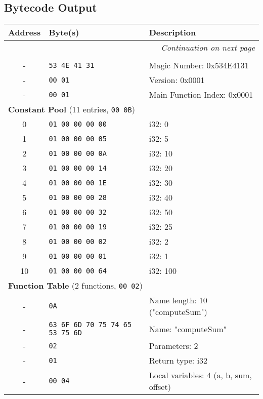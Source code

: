 \documentclass[a4paper,12pt]{article}
\begin{document}
    \subsection{Bytecode Output}
    \begin{longtable}{|c|l|p{6cm}|}
    \hline
    \textbf{Address} & \textbf{Byte(s)} & \textbf{Description} \\ \hline
    \endhead
    \multicolumn{3}{r}{\textit{Continuation on next page}} \\
    \endfoot
    \endlastfoot
    \multicolumn{3}{|l|}{\textbf{Header}} \\ \hline
    - & \texttt{53 4E 41 31} & Magic Number: 0x534E4131 \\ \hline
    - & \texttt{00 01} & Version: 0x0001 \\ \hline
    - & \texttt{00 01} & Main Function Index: 0x0001 \\ \hline
    \multicolumn{3}{|l|}{\textbf{Constant Pool} (11 entries, \texttt{00 0B})} \\ \hline
    0 & \texttt{01 00 00 00 00} & i32: 0 \\ \hline
    1 & \texttt{01 00 00 00 05} & i32: 5 \\ \hline
    2 & \texttt{01 00 00 00 0A} & i32: 10 \\ \hline
    3 & \texttt{01 00 00 00 14} & i32: 20 \\ \hline
    4 & \texttt{01 00 00 00 1E} & i32: 30 \\ \hline
    5 & \texttt{01 00 00 00 28} & i32: 40 \\ \hline
    6 & \texttt{01 00 00 00 32} & i32: 50 \\ \hline
    7 & \texttt{01 00 00 00 19} & i32: 25 \\ \hline
    8 & \texttt{01 00 00 00 02} & i32: 2 \\ \hline
    9 & \texttt{01 00 00 00 01} & i32: 1 \\ \hline
    10 & \texttt{01 00 00 00 64} & i32: 100 \\ \hline
    \multicolumn{3}{|l|}{\textbf{Function Table} (2 functions, \texttt{00 02})} \\ \hline
    - & \texttt{0A} & Name length: 10 ("computeSum") \\ \hline
    - & \texttt{63 6F 6D 70 75 74 65 53 75 6D} & Name: "computeSum" \\ \hline
    - & \texttt{02} & Parameters: 2 \\ \hline
    - & \texttt{01} & Return type: i32 \\ \hline
    - & \texttt{00 04} & Local variables: 4 (a, b, sum, offset) \\ \hline

\end{longtable}
\end{document}
